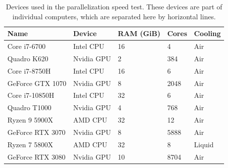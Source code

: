 \documentclass{jors}
\begin{document}
		\begin{table}[h!]
			\caption{Devices used in the parallelization speed test.
			These devices are part of individual computers, which are separated here by horizontal lines.}
			\label{tab:devices}
			\begin{tabular}{l|l|l|l|l}
				\textbf{Name}	&\textbf{Device}&\textbf{RAM (GiB)}	&\textbf{Cores}	&\textbf{Cooling}\\
				\hline
				Core i7-6700	&Intel CPU		&16					&4				&Air\\
				Quadro K620		&Nvidia GPU		&2					&384			&Air\\
				\hline
				Core i7-8750H	&Intel CPU		&16					&6				&Air\\
				GeForce GTX 1070&Nvidia GPU		&8					&2048			&Air\\
				\hline
				Core i7-10850H	&Intel CPU		&32					&6				&Air\\
				Quadro T1000	&Nvidia GPU		&4					&768			&Air\\
				\hline
				Ryzen 9 5900X	&AMD CPU		&32					&12				&Air\\
				GeForce RTX 3070&Nvidia GPU		&8					&5888			&Air\\
				\hline
				Ryzen 7 5800X	&AMD CPU		&32					&8				&Liquid\\
				GeForce RTX 3080&Nvidia GPU		&10					&8704			&Air\\
			\end{tabular}
		\end{table}
\end{document}
